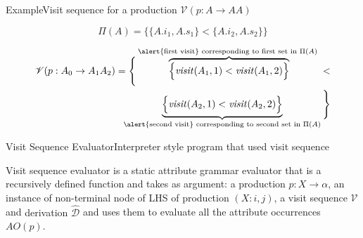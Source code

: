 \begin{frame}{Example}{Visit sequence for a production $\mathscr{V}(p: A \rightarrow A A)$}

\[ \Pi(A) = \Big\{ \{ A.i_1, A.s_1 \} < \{ A.i_2, A.s_2 \} \Big\} \]

\begin{equation}
\begin{gathered}
\begin{split}
\mathscr{V}(p: A_0 \rightarrow A_1 A_2) = \Bigg\{               
   \overbrace{ \Big\{  \mathit{visit}(A_1, 1)  < \mathit{visit}(A_1, 2)	 \Big\}}^\text{\alert{first visit} corresponding to first set in $\Pi(A)$ }  <  \\
   \underbrace{ \Big\{  \mathit{visit}(A_2, 1)  < \mathit{visit}(A_2, 2) \Big\}}_\text{\alert{second visit} corresponding to second set in $\Pi(A)$}
\Bigg\}
\end{split}
\end{gathered}
\end{equation}

\end{frame}


\begin{frame}{Visit Sequence Evaluator}{Interpreter style program that used visit sequence}

\begin{definition}
Visit sequence evaluator is a static attribute grammar evaluator that is a \alert{recursively defined function} and takes as argument: a production $p: X \rightarrow \alpha$, an instance of non-terminal node of LHS of production $(X:i, j)$, \alert{a visit sequence $\mathscr{V}$} and \alert{derivation $\hat{\mathscr{D}}$} and uses them to evaluate all the attribute occurrences \alert{$\mathit{AO}(p)$}.
\end{definition}

\end{frame}


